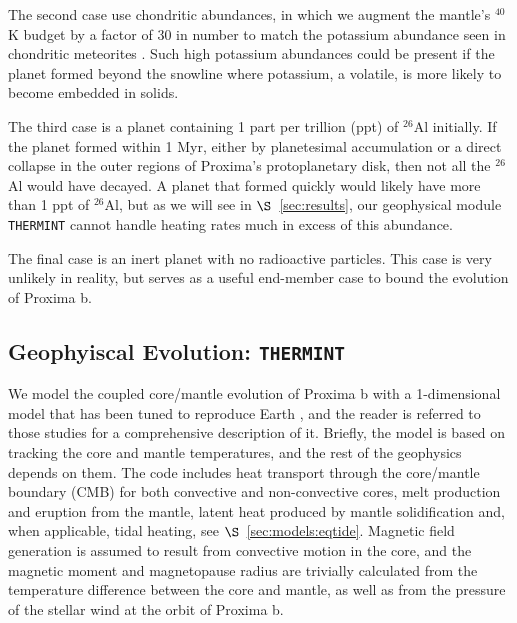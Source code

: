 \documentclass[preprint,12pt]{aastex}
\def\thermint{\texttt{\footnotesize{THERMINT}}\xspace}
\begin{document}
The second case use chondritic abundances, in which we augment the
mantle's $^{40}$K budget by a factor of 30 in number to match the
potassium abundance seen in chondritic meteorites
\citep{AndersGrevesse89,Arevalo09}. Such high potassium abundances could be
present if the planet formed beyond the snowline where potassium, a
volatile, is more likely to become embedded in solids.

The third case is a planet containing 1 part per trillion (ppt) of
$^{26}$Al initially. If the planet formed within 1 Myr, either by
planetesimal accumulation or a direct collapse in the outer regions of
Proxima's protoplanetary disk, then not all the $^{26}$Al would have
decayed. A planet that formed quickly would likely have more than 1
ppt of $^{26}$Al, but as we will see in $\S$~\ref{sec:results}, our
geophysical module \thermint cannot handle heating rates much in
excess of this abundance.

The final case is an inert planet with no radioactive particles. This
case is very unlikely in reality, but serves as a useful end-member
case to bound the evolution of Proxima b.

\subsection{Geophyiscal Evolution: \thermint}
\label{sec:models:thermint}

We model the coupled core/mantle evolution of Proxima b with a
1-dimensional model that has been tuned to reproduce Earth
\citep{DriscollOlson11,DriscollBercovici13,DriscollBercovici14,DriscollBarnes15}, and the
reader is referred to those studies for a comprehensive description of
it. Briefly, the model is based on tracking the core and mantle
temperatures, and the rest of the geophysics depends on them. The code
includes heat transport through the core/mantle boundary (CMB) for
both convective and non-convective cores, melt production and eruption
from the mantle, latent heat produced by mantle solidification and,
when applicable, tidal heating, see $\S$~\ref{sec:models:eqtide}. Magnetic field
generation is assumed to result from convective motion in the core,
and the magnetic moment and magnetopause radius are trivially
calculated from the temperature difference between the core and
mantle, as well as from the pressure of the stellar wind at the orbit
of Proxima b.
\end{document}
